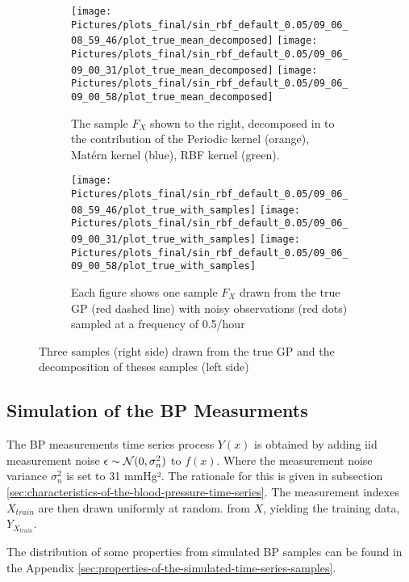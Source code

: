 \begin{figure}[!h]
\centering
\begin{subfigure}{.45\textwidth}
    \centering
    \texttt{[image: Pictures/plots\_final/sin\_rbf\_default\_0.05/09\_06\_08\_59\_46/plot\_true\_mean\_decomposed]}
    \texttt{[image: Pictures/plots\_final/sin\_rbf\_default\_0.05/09\_06\_09\_00\_31/plot\_true\_mean\_decomposed]}
    \texttt{[image: Pictures/plots\_final/sin\_rbf\_default\_0.05/09\_06\_09\_00\_58/plot\_true\_mean\_decomposed]}
  \caption{The sample $F_X$ shown to the right, decomposed in to the contribution of the Periodic kernel (orange),
      Matérn kernel (blue), RBF kernel (green).}
  \label{fig:true_mean_decomposed}
\end{subfigure}\hfill
\begin{subfigure}{.45\textwidth}
    \centering
    \texttt{[image: Pictures/plots\_final/sin\_rbf\_default\_0.05/09\_06\_08\_59\_46/plot\_true\_with\_samples]}
    \texttt{[image: Pictures/plots\_final/sin\_rbf\_default\_0.05/09\_06\_09\_00\_31/plot\_true\_with\_samples]}
    \texttt{[image: Pictures/plots\_final/sin\_rbf\_default\_0.05/09\_06\_09\_00\_58/plot\_true\_with\_samples]}
  \caption{Each figure shows one sample $F_X$ drawn from the true GP (red dashed line) with noisy observations
      (red dots) sampled at a frequency of 0.5/hour}
  \label{fig:sub2}
\end{subfigure}
\caption{Three samples (right side) drawn from the true GP and the decomposition of theses samples (left side)}
\label{fig:true_gp_samples}
\end{figure}



\subsection{Simulation of the BP Measurments}

The BP measurements time series process $Y(x)$ is obtained by adding iid measurement noise
$\epsilon \sim \operatorname{\mathcal{N}}(0, \sigma_n^2)$ to $f(x)$.
Where the measurement noise variance $\sigma_n^2$ is set to 31 mmHg².
The rationale for this is given in subsection
\ref{sec:characteristics-of-the-blood-pressure-time-series}.
The measurement indexes $X_{train}$ are then drawn uniformly at random.
from $X$, yielding the training data, $Y_{X_{train}}$.

The distribution of some properties from simulated BP samples can be found in the
Appendix \ref{sec:properties-of-the-simulated-time-series-samples}.


